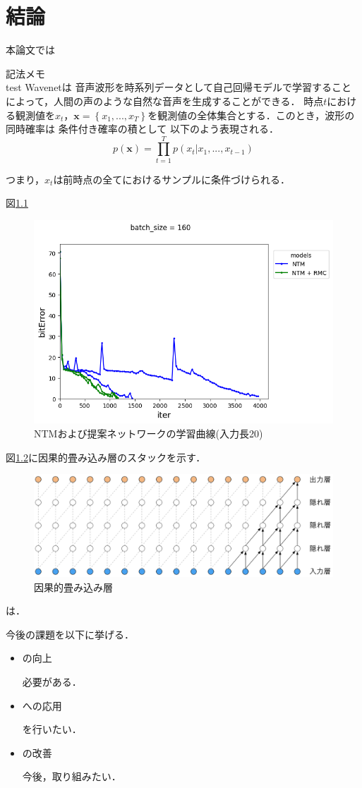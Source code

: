 \chapter{結論}
本論文では

記法メモ\\
test\cite{babi} \cite{memory_net} \cite{ntm} \cite{dnc} \cite{cslm} \cite{rrnn} \cite{simple_rel}
\cite{sam} \cite{gat} \cite{working2mem}
Wavenet\cite{oord2016wavenet}は
音声波形を時系列データとして自己回帰モデルで学習することによって，人間の声のような自然な音声を生成することができる．
時点$t$における観測値を$x_t$，$\bm{x} = \left\{ x_1, ..., x_T \right\}$を観測値の全体集合とする．このとき，波形の同時確率は 条件付き確率の積として
以下のよう表現される．
\begin{equation}
	p(\bm{x}) = \prod_{t=1}^T p(x_t | x_1, ..., x_{t-1})
\end{equation}

つまり，$x_t$は前時点の全てにおけるサンプルに条件づけられる．

図\ref{fig:priority_rrnn_m20l20}
\begin{figure}[t]
	\centering
	\includegraphics[width=\linewidth]{./figure/priority/rrnn_m20l20.png}
	\caption{NTMおよび提案ネットワークの学習曲線(入力長20)}
	\label{fig:priority_rrnn_m20l20}
\end{figure}

図\ref{fig:ccl}に因果的畳み込み層のスタックを示す．

\begin{figure}[t]
	\centering
	\includegraphics[width=\linewidth]{./figure/ccl.png}
	\caption{因果的畳み込み層}
	\label{fig:ccl}
\end{figure}

\cite{juang1991hidden}は．

今後の課題を以下に挙げる．
\begin{itemize}
	\item の向上
	\par
	必要がある．
	\item への応用
	\par
	を行いたい．
	\newpage
	\item の改善
	\par
	今後，取り組みたい．
\end{itemize}
